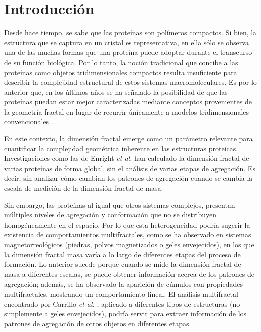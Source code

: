 \chapter{Introducci\'{o}n}

Desde hace tiempo, se sabe que las prote\'{i}nas son pol\'{i}meros compactos. Si bien, la estructura que se captura en un cristal es representativa, en ella s\'{o}lo se observa una de las muchas formas que una prote\'{i}na puede adoptar durante el transcurso de su funci\'{o}n biol\'{o}gica. Por lo tanto, la noci\'{o}n tradicional que concibe a las prote\'{i}nas como objetos tridimensionales compactos resulta insuficiente para describir la complejidad estructural de estos sistemas macromoleculares. Es por lo anterior que, en los \'{u}ltimos años se ha señalado la posibilidad de que las prote\'{i}nas puedan estar mejor caracterizadas mediante conceptos provenientes de la geometr\'{i}a fractal en lugar de recurrir \'{u}nicamente a modelos tridimensionales convencionales \cite{Dewey1997, Mustafa1996, Vicsek1992 	, Cserzo1991}.

En este contexto, la dimensi\'{o}n fractal emerge como un par\'{a}metro relevante para cuantificar la complejidad geom\'{e}trica inherente en las estructuras proteicas. Investigaciones como las de Enright \textit{et al.} \cite{Enright2005, Enright2006} han calculado la dimensi\'{o}n fractal de varias prote\'{i}nas de forma global, sin el an\'{a}lisis de varias etapas de agregaci\'{o}n. Es decir, sin analizar c\'{o}mo cambian los patrones de agregaci\'{o}n cuando se cambia la escala de medici\'{o}n de la dimensi\'{o}n fractal de masa.


Sin embargo, las prote\'{i}nas al igual que otros sistemas complejos, presentan m\'{u}ltiples niveles de agregaci\'{o}n y conformaci\'{o}n que no se distribuyen homog\'{e}neamente en el espacio. Por lo que esta heterogeneidad podr\'{i}a sugerir la existencia de comportamientos multifractales, como se ha observado en sistemas magnetorreol\'{o}gicos (piedras, polvos magnetizados o geles envejecidos), en los que la dimensi\'{o}n fractal masa var\'{i}a a lo largo de diferentes etapas del proceso de formaci\'{o}n. Lo anterior sucede porque cuando se mide la dimensi\'{o}n fractal de masa a diferentes escalas, se puede obtener informaci\'{o}n acerca de los patrones de agregaci\'{o}n; adem\'{a}s, se ha observado la aparici\'{o}n de c\'{u}mulos  con propiedades multifractales, mostrando un comportamiento lineal. El an\'{a}lisis multifractal encontrado por Carrillo \textit{et al.} \cite{Carrillo2003}, aplicado a diferentes tipos de estructuras (no simplemente a geles envejecidos), podr\'{i}a servir para extraer informaci\'{o}n de los patrones de agregaci\'{o}n de otros objetos en diferentes etapas. 

